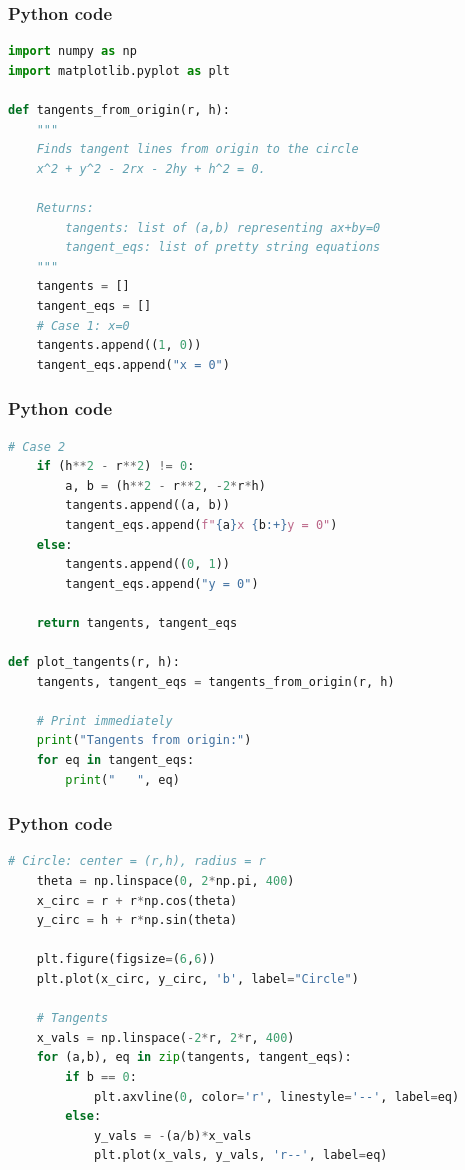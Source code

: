 \documentclass{beamer}
\begin{document}
\begin{frame}[fragile]
    \frametitle{Python code}
    \begin{lstlisting}[language=Python]
import numpy as np
import matplotlib.pyplot as plt

def tangents_from_origin(r, h):
    """
    Finds tangent lines from origin to the circle
    x^2 + y^2 - 2rx - 2hy + h^2 = 0.
    
    Returns:
        tangents: list of (a,b) representing ax+by=0
        tangent_eqs: list of pretty string equations
    """
    tangents = []
    tangent_eqs = []
    # Case 1: x=0
    tangents.append((1, 0))
    tangent_eqs.append("x = 0")

    \end{lstlisting}   
\end{frame}

\begin{frame}[fragile]
    \frametitle{Python code}
    \begin{lstlisting}[language=Python]
# Case 2
    if (h**2 - r**2) != 0:
        a, b = (h**2 - r**2, -2*r*h)
        tangents.append((a, b))
        tangent_eqs.append(f"{a}x {b:+}y = 0")
    else:
        tangents.append((0, 1))
        tangent_eqs.append("y = 0")
        
    return tangents, tangent_eqs

def plot_tangents(r, h):
    tangents, tangent_eqs = tangents_from_origin(r, h)
    
    # Print immediately
    print("Tangents from origin:")
    for eq in tangent_eqs:
        print("   ", eq)
    \end{lstlisting}   
\end{frame}

\begin{frame}[fragile]
    \frametitle{Python code}
    \begin{lstlisting}[language=Python]
# Circle: center = (r,h), radius = r
    theta = np.linspace(0, 2*np.pi, 400)
    x_circ = r + r*np.cos(theta)
    y_circ = h + r*np.sin(theta)

    plt.figure(figsize=(6,6))
    plt.plot(x_circ, y_circ, 'b', label="Circle")

    # Tangents
    x_vals = np.linspace(-2*r, 2*r, 400)
    for (a,b), eq in zip(tangents, tangent_eqs):
        if b == 0:
            plt.axvline(0, color='r', linestyle='--', label=eq)
        else:
            y_vals = -(a/b)*x_vals
            plt.plot(x_vals, y_vals, 'r--', label=eq)
    \end{lstlisting}   
\end{frame}
\end{document}
